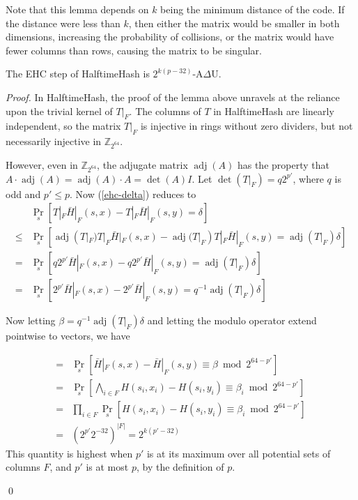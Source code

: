 \documentclass[runningheads]{llncs}
\DeclareMathOperator{\adj}{adj}
\newcommand{\ints}{\mathbb{Z}}
\begin{document}
Note that this lemma depends on $k$ being the minimum distance of the code.
If the distance were less than $k$, then either the matrix would be smaller in both dimensions, increasing the probability of collisions, or the matrix would have fewer columns than rows, causing the matrix to be singular.

\begin{theorem}
  The EHC step of HalftimeHash is $2^{k(p-32)}$-A$\Delta$U.
\end{theorem}

\begin{proof}
  In HalftimeHash, the proof of the lemma above unravels at the reliance upon the trivial kernel of $T|_F$.
  The columns of $T$ in HalftimeHash are linearly independent, so the matrix $T|_F$ is injective in rings without zero dividers, but not necessarily injective in $\ints_{2^{64}}$.

  However, even in $\ints_{2^{64}}$, the adjugate matrix $\adj(A)$ has the property that $A \cdot \adj(A) = \adj(A) \cdot A = \det(A) I$.
  Let $\det(T|_F) = q2^{p'}$, where $q$ is odd and $p' \le p$.
  Now (\ref{ehc-delta}) reduces to
  \[
  \begin{array}{rl}
    &   \Pr_s[T|_F \bar{H}|_F(s,x) - T|_F \bar{H}|_F(s,y) = \delta]\\
    \leq &  \Pr_s[\adj(T|_F) T|_F \bar{H}|_F(s,x) - \adj(T|_F) T|_F \bar{H}|_F(s,y) = \adj(T|_F) \delta] \\
    = &  \Pr_s[q2^{p'}\bar{H}|_F(s,x) - q2^{p'}\bar{H}|_F(s,y) = \adj(T|_F) \delta] \\
    = &  \Pr_s[2^{p'}\bar{H}|_F(s,x) - 2^{p'}\bar{H}|_F(s,y) = q^{-1} \adj(T|_F) \delta]
  \end{array}
  \]

  Now letting $\beta = q^{-1} \adj(T|_F) \delta$ and letting the modulo operator extend pointwise to vectors, we have

  \[
  \begin{array}{rl}
    = &  \Pr_s[\bar{H}|_F(s,x) - \bar{H}|_F(s,y) \equiv \beta \bmod 2^{64-p'}] \\
    = &  \Pr_s\left[\bigwedge_{i \in F} H(s_i,x_i) - H(s_i,y_i) \equiv \beta_i \bmod 2^{64-p'}\right] \\
    = &  \prod_{i \in F} \Pr_s\left[ H(s_i,x_i) - H(s_i,y_i) \equiv \beta_i \bmod 2^{64-p'}\right] \\
    = & \left(2^{p'} 2^{-32}\right)^{|F|} = 2^{k(p'-32)}
  \end{array}
  \]
  This quantity is highest when $p'$ is at its maximum over all potential sets of columns $F$, and $p'$ is at most $p$, by the definition of $p$.

  \qed
\end{proof}
\end{document}
